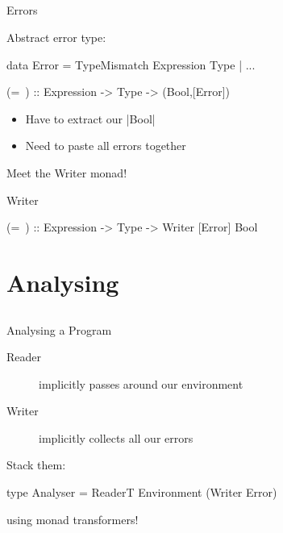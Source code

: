 \subsection*{}

\begin{frame}[fragile]{Errors}

  Abstract error type:

    \begin{HASKELL}
      data Error = TypeMismatch Expression Type | ...
    \end{HASKELL}
  
  \pause

  \begin{block}{}
    \begin{HASKELL}
      (=~) :: Expression -> Type -> (Bool,[Error])
    \end{HASKELL}
  \end{block}

  \pause

  \begin{itemize}
    \item Have to extract our |Bool| \frownie
    \item Need to paste all errors together \frownie
  \end{itemize}

  \pause
  Meet the Writer monad!

  \begin{block}{Writer}
    \begin{HASKELL}
      (=~) :: Expression -> Type -> Writer [Error] Bool
    \end{HASKELL}
  \end{block}

\end{frame}

\section{Analysing}
\subsection*{}

\begin{frame}[fragile]{Analysing a Program}
  
  \begin{description}
    \item[Reader] implicitly passes around our environment
    \item[Writer] implicitly collects all our errors
  \end{description}

  \pause
  \bigskip

  Stack them:

  \begin{block}{}
    \begin{HASKELL}
      type Analyser = ReaderT Environment (Writer Error)
    \end{HASKELL}
  \end{block}

  using monad transformers!

\end{frame}

